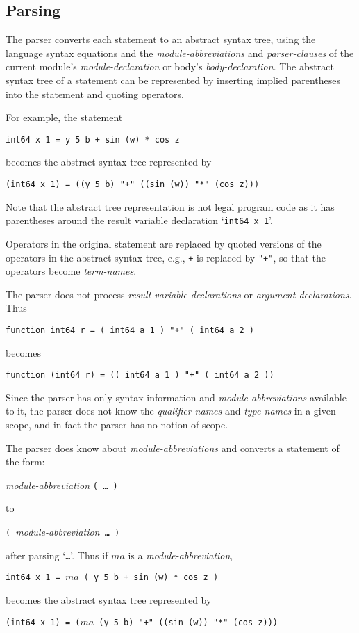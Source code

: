 \documentclass[12pt]{article}
\begin{document}
\subsection{Parsing}

The parser converts each statement to an abstract syntax tree,
using the language syntax equations and the {\em module-abbreviations}
and {\em parser-clauses}
of the current module's {\em module-declaration} or body's
{\em body-declaration}.  The abstract syntax
tree of a statement can be represented by inserting implied
parentheses into the statement and quoting operators.

For example, the statement
\begin{center}
\tt int64 x 1 = y 5 b + sin (w) * cos z
\end{center}
becomes the abstract syntax tree represented by
\begin{center}
\tt (int64 x 1) = ((y 5 b) "+" ((sin (w)) "*" (cos z)))
\end{center}
Note that the abstract tree representation is not legal
program code as it has parentheses around the result
variable declaration `{\tt int64 x 1}'.

Operators in the original statement are replaced by quoted
versions of the operators in the abstract
syntax tree, e.g., {\tt +} is replaced by {\tt "+"}, so that
the operators become {\em term-names}.

The parser does not process {\em result-variable-declarations} or
{\em argument-declarations}.  Thus
\begin{center}
\tt function int64 r = ( int64 a 1 ) "+" ( int64 a 2 )
\end{center}
becomes
\begin{center}
\tt function (int64 r) = (( int64 a 1 ) "+" ( int64 a 2 ))
\end{center}

Since the parser has only syntax information and {\em module-abbreviations}
available to
it, the parser does not know the {\em qualifier-names}
and {\em type-names} in a given scope, and in fact the parser
has no notion of scope.

The parser does know about {\em module-abbreviations} and
converts a statement of the form:
\begin{center}
{\em module-abbreviation} {\tt (~\ldots~)}
\end{center}
to
\begin{center}
{\tt (~}{\em module-abbreviation}{\tt ~\ldots~)}
\end{center}
after parsing `{\tt \ldots}'.  Thus if $ma$ is a {\em module-abbreviation},
\begin{center}
\tt int64 x 1 = $ma$ ( y 5 b + sin (w) * cos z )
\end{center}
becomes the abstract syntax tree represented by
\begin{center}
\tt (int64 x 1) = ($ma$ (y 5 b) "+" ((sin (w)) "*" (cos z)))
\end{center}
\end{document}
